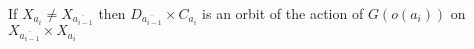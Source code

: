 \documentclass[preview]{standalone}
\begin{document}
If $X_{a_{i}} \not= X_{\overline{a_{i-1}}}$ then $D_{\overline{a_{i-1}}} \times C_{a_{i}}$ is an orbit of the action of $G(o(a_{i}))$ on $X_{\overline{a_{i-1}}} \times X_{a_{i}}$\\
\end{document}
